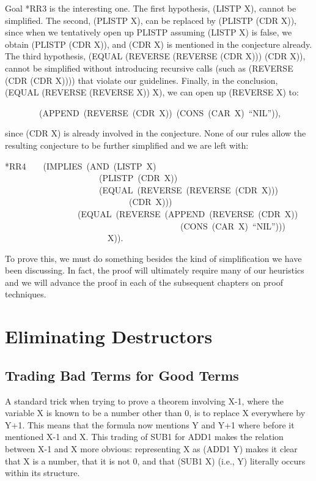 \documentclass[11pt]{book}
\newenvironment{pubasis}{\begin{flushleft}\ttfamily\small}{\normalsize\rmfamily\end{flushleft}}
\newcommand{\pubdefaulttextsize}{\large}
\begin{document}
Goal *RR3 is the interesting one.  The first hypothesis, (LISTP X), cannot
be simplified.  The second, (PLISTP X), can be replaced by (PLISTP (CDR X)),
since when we tentatively open up PLISTP assuming (LISTP X) is false, we
obtain (PLISTP (CDR X)), and (CDR X) is mentioned in the conjecture already.
The third hypothesis, (EQUAL (REVERSE (REVERSE (CDR X))) (CDR X)), cannot be simplified
without introducing recursive calls (such as (REVERSE (CDR (CDR X)))) that
violate our guidelines.  Finally, in the conclusion, (EQUAL (REVERSE (REVERSE X))  X),
we can open up (REVERSE X) to:
\begin{pubasis}
~~~~~~~~(APPEND~(REVERSE~(CDR~X))~(CONS~(CAR~X)~``NIL'')),\\
\end{pubasis}
since (CDR X) is already involved in the conjecture.   None of our rules allow the resulting conjecture to be further
simplified and we are left with:
\begin{pubasis}
*RR4~~~~(IMPLIES~(AND~(LISTP~X)\\
~~~~~~~~~~~~~~~~~~~~~~(PLISTP~(CDR~X))\\
~~~~~~~~~~~~~~~~~~~~~~(EQUAL~(REVERSE~(REVERSE~(CDR~X)))\\
~~~~~~~~~~~~~~~~~~~~~~~~~~~~~(CDR~X)))\\
~~~~~~~~~~~~~~~~~(EQUAL~(REVERSE~(APPEND~(REVERSE~(CDR~X))\\
~~~~~~~~~~~~~~~~~~~~~~~~~~~~~~~~~~~~~~~~~(CONS~(CAR~X)~``NIL'')))\\
~~~~~~~~~~~~~~~~~~~~~~~~X)).\\
\end{pubasis}
To prove this, we must do something besides the kind of simplification we
have been discussing.  In fact, the proof will ultimately require many of our heuristics
and we will advance the proof in each of the subsequent chapters
on proof techniques.
\chapter{Eliminating Destructors}
\label{SECELIMINATINGDESTRUCTORS}
\pubdefaulttextsize
\section{Trading Bad Terms for Good Terms}
\pubdefaulttextsize
A standard trick when trying to prove a theorem involving
X-1, where the variable X is known to be a number other than 0,
is to replace   X everywhere  by Y+1.  This means that the formula
now mentions Y and Y+1 where before it mentioned X-1 and X.
This trading of SUB1 for ADD1 makes
the relation between X-1 and X more obvious:
representing X as (ADD1 Y) makes it clear that X is a number,
that it is not 0, and that (SUB1 X) (i.e., Y) literally occurs within its
structure.
\end{document}
